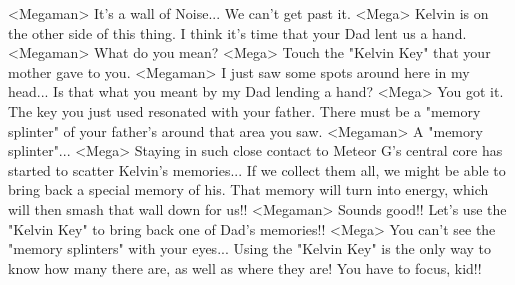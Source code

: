<Megaman> It's a wall of Noise... 
We can't get past it. 
<Mega> Kelvin is on the other side of this thing. 
I think it's time that your Dad lent us a hand. 
<Megaman> What do you mean? 
<Mega> Touch the "Kelvin Key" that your mother gave to you. 
<Megaman> I just saw some spots around here in my head... 
Is that what you meant by my Dad lending a hand? 
<Mega> You got it. 
The key you just used resonated with your father. 
There must be a "memory splinter" of your father's around that area you saw. 
<Megaman> A "memory splinter"... 
<Mega> Staying in such close contact to Meteor G's central core 
has started to scatter Kelvin's memories... 
If we collect them all, we might be able to bring back a special memory of his. 
That memory will turn into energy, which will then smash that wall down for us!! 
<Megaman> Sounds good!! 
Let's use the "Kelvin Key" to bring back one of Dad's memories!! 
<Mega> You can't see the "memory splinters" with your eyes... 
Using the "Kelvin Key" is the only way to know how many 
there are, as well as where they are! 
You have to focus, kid!! 
